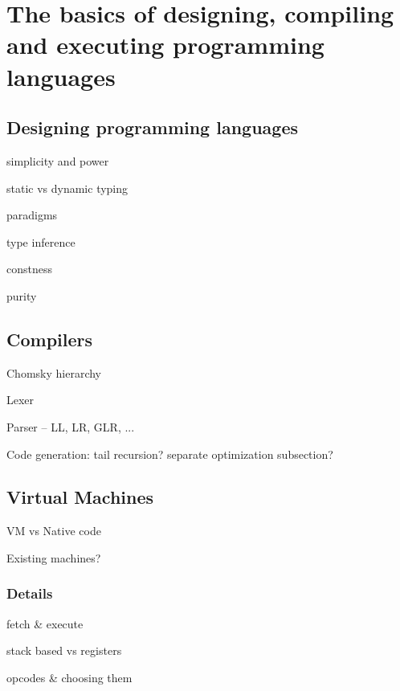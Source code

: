 \chapter{The basics of designing, compiling and executing programming languages}


    \section{Designing programming languages}
    
        simplicity and power
        
        static vs dynamic typing
        
        paradigms
        
        type inference
        
        constness
        
        purity
    
    \section{Compilers}
    
        Chomsky hierarchy
        
        Lexer
        
        Parser -- LL, LR, GLR, ...
        
        Code generation: tail recursion? separate optimization subsection?
    
    \section{Virtual Machines}
    
        VM vs Native code
        
        Existing machines?
        
        \subsection{Details} %
            fetch \& execute
            
            stack based vs registers
            
            opcodes \& choosing them
            
